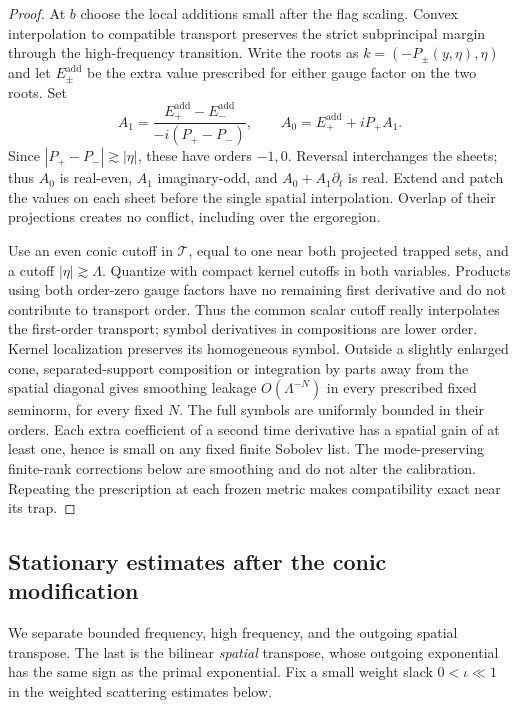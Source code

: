 \begin{proof}
At $b$ choose the local additions small after the flag scaling.
Convex interpolation to compatible transport preserves the strict
subprincipal margin through the high-frequency transition.
Write the roots as $k=(-P_\pm(y,\eta),\eta)$ and let
$E_\pm^{\mathrm{add}}$ be the extra value prescribed for either
gauge factor on the two roots.  Set
\begin{equation}\label{st:root-interpolation}
 A_1=\frac{E_+^{\mathrm{add}}-E_-^{\mathrm{add}}}
                  {-i(P_+-P_-)},\qquad
 A_0=E_+^{\mathrm{add}}+iP_+A_1.
\end{equation}
Since $|P_+-P_-|\gtrsim|\eta|$, these have orders $-1,0$.
Reversal interchanges the sheets; thus $A_0$ is real-even,
$A_1$ imaginary-odd, and $A_0+A_1\partial_t$ is real.
Extend and patch the values on each sheet before the single
spatial interpolation.  Overlap of their projections creates no
conflict, including over the ergoregion.

Use an even conic cutoff in $\mathcal T$, equal to one near both
projected trapped sets, and a cutoff $|\eta|\gtrsim\Lambda$.
Quantize with compact kernel cutoffs in both variables.  Products
using both order-zero gauge factors have no remaining first
derivative and do not contribute to transport order.  Thus the
common scalar cutoff really interpolates the first-order transport;
symbol derivatives in compositions are lower order.  Kernel
localization preserves its homogeneous symbol.  Outside a slightly
enlarged cone, separated-support composition or integration by
parts away from the spatial diagonal gives smoothing leakage
$O(\Lambda^{-N})$ in every prescribed fixed seminorm, for every
fixed $N$.  The full symbols are uniformly bounded in their
orders.  Each extra coefficient of a second time derivative has
a spatial gain of at least one, hence is small on any fixed
finite Sobolev list.  The mode-preserving finite-rank corrections
below are smoothing and do not alter the calibration.  Repeating
the prescription at each frozen metric makes compatibility exact
near its trap.
\end{proof}

\subsection{Stationary estimates after the conic modification}

We separate bounded frequency, high frequency, and the outgoing
spatial transpose.  The last is the bilinear \emph{spatial}
transpose, whose outgoing exponential has the same sign as the
primal exponential. Fix a small weight slack $0<\iota\ll1$ in the
weighted scattering estimates below.

